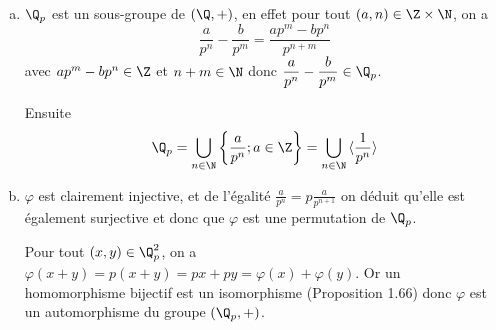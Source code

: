 \begin{enumerate}[a)]
  \item $\Q_p$ est un sous-groupe de $(\Q,+)$, en effet pour tout
    $(a,n)\in\Z\times\N$, on a
    \[
      \frac{a}{p^n}-\frac{b}{p^m} = \frac{ap^m-bp^n}{p^{n+m}}
    \]
    avec $ap^m-bp^n\in\Z$ et $n+m\in\N$ donc
    $\dfrac{a}{p^n}-\dfrac{b}{p^m}\in\Q_p$.
    
    Ensuite
    \[
      \Q_p = \bigcup_{n\in\N} \left\{\frac{a}{p^n}; a\in\Z\right\} = 
        \bigcup_{n\in\N} \,\langle\frac{1}{p^n}\rangle
    \]

  \item $\varphi$ est clairement injective, et de l'égalité
    $\frac{a}{p^n} = p\frac{a}{p^{n+1}}$ on déduit qu'elle est également
    surjective et donc que $\varphi$ est une permutation de $\Q_p$.

    Pour tout $(x,y)\in\Q_p^2$, on a
    $\varphi(x+y) = p(x+y) = px+py = \varphi(x)+\varphi(y)$. Or un homomorphisme
    bijectif est un isomorphisme (Proposition 1.66) donc $\varphi$ est un
    automorphisme du groupe $(\Q_p,+)$.
\end{enumerate}
